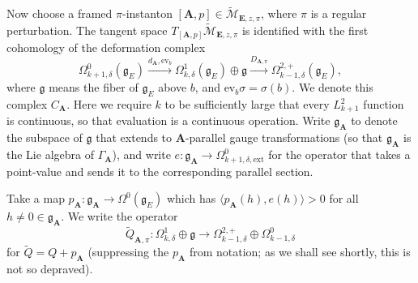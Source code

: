 \documentclass[10pt,a4paper]{amsart}
\theoremstyle{definition}
\theoremstyle{remark}
\numberwithin{figure}{qchap}
\begin{document}
Now choose a framed $\pi$-instanton $[\mathbf{A}, p] \in \widetilde{\mathcal M}_{\mathbf{E},z,\pi}$, where $\pi$ is a regular perturbation. The tangent space $T_{[\mathbf{A}, p]} \widetilde{\mathcal M}_{\mathbf{E},z,\pi}$ is identified with the first cohomology of the deformation complex $$\Omega^0_{k+1,\delta}(\mathfrak g_E) \xrightarrow{d_\mathbf{A}, \text{ev}_b} \Omega^1_{k,\delta}(\mathfrak g_E) \oplus \mathfrak g \xrightarrow{D_{\mathbf{A},\pi}} \Omega^{2,+}_{k-1,\delta}(\mathfrak g_E),$$ where $\mathfrak g$ means the fiber of $\mathfrak g_E$ above $b$, and $\text{ev}_b \sigma = \sigma(b)$. We denote this complex $C_{\mathbf{A}}$. Here we require $k$ to be sufficiently large that every $L^2_{k+1}$ function is continuous, so that evaluation is a continuous operation. Write $\mathfrak g_{\mathbf{A}}$ to denote the subspace of $\mathfrak g$ that extends to $\mathbf{A}$-parallel gauge transformations (so that $\mathfrak g_{\mathbf{A}}$ is the Lie algebra of $\Gamma_{\mathbf{A}}$), and write $e: \mathfrak g_{\mathbf{A}} \to \Omega^0_{k+1,\delta,\text{ext}}$ for the operator that takes a point-value and sends it to the corresponding parallel section.

Take a map $p_{\mathbf{A}}: \mathfrak g_{\mathbf{A}} \to \Omega^0(\mathfrak g_E)$ which has $\langle p_{\mathbf{A}}(h), e(h) \rangle > 0$ for all $h \neq 0 \in \mathfrak g_{\mathbf{A}}$. We write the operator $$\widetilde Q_{\mathbf{A},\pi}: \Omega^1_{k,\delta} \oplus \mathfrak g \to \Omega^{2,+}_{k-1,\delta} \oplus \Omega^0_{k-1,\delta}$$ for $\widetilde Q = Q + p_{\mathbf{A}}$ (suppressing the $p_{\mathbf{A}}$ from notation; as we shall see shortly, this is not so depraved).
\end{document}
